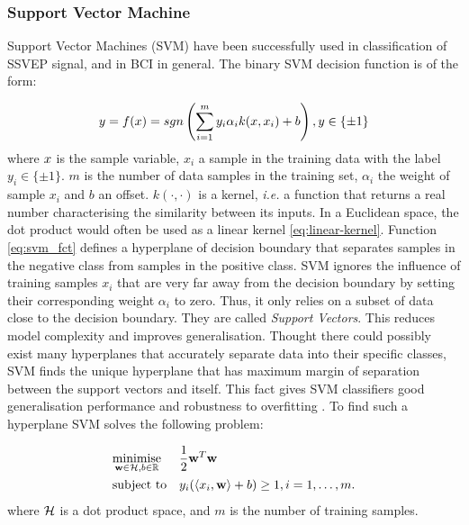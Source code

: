 \subsubsection{Support Vector Machine}
\label{subsubsec:svm}

Support Vector Machines (SVM) have been successfully used in classification of SSVEP signal, and in BCI in general.
The binary SVM decision function is of the form:

\begin{equation}
\label{eq:svm_fct}
y = f(x) = sgn \left( \sum_{i=1}^m y_i \alpha_i k(\x,\x_i) + b \right), y \in \{\pm 1\}
\end{equation}
where $x$ is the sample variable, $x_i$ a sample in the training data with the label $y_i \in \{\pm 1\}$. $m$ is the number of data samples in the training set, $\alpha_i$ the weight of sample $x_i$ and $b$ an offset.
$k(\cdot,\cdot)$ is a kernel, \textit{i.e.} a function that returns a real number characterising the similarity between its inputs. 
In a Euclidean space, the dot product would often be used as a linear kernel \eqref{eq:linear-kernel}.
Function \eqref{eq:svm_fct} defines a hyperplane of decision boundary that separates samples in the negative class from samples in the positive class.
SVM ignores the influence of training samples $x_i$ that are very far away from the decision boundary by setting their corresponding weight $\alpha_i$ to zero.
Thus, it only relies on a subset of data close to the decision boundary. They are called \emph{Support Vectors}. 
This reduces model complexity and improves generalisation.  
Thought there could possibly exist many hyperplanes that accurately separate data into their specific classes, SVM finds the unique hyperplane that has maximum margin of separation between the support vectors and itself. 
This fact gives SVM classifiers good generalisation performance and robustness to overfitting \citep{scholkopf_learning_2001, ang_filter_2008, ang_filter_2012}. 
To find such a hyperplane SVM solves the following problem:

\begin{equation}
\label{eq:svm_problem}
\begin{aligned}
& \underset{\w \in \dotSpace, b \in \Re}{\text{minimise}}
& & \frac{1}{2} \w^T \w \\
& \text{subject to}
& & y_i( \left\langle \x_i, \w \right\rangle + b )\geq 1, i = 1, \dots, m.
\end{aligned}
\end{equation} 
where $\mathcal{H}$ is a dot product space, and $m$ is the number of training samples.

